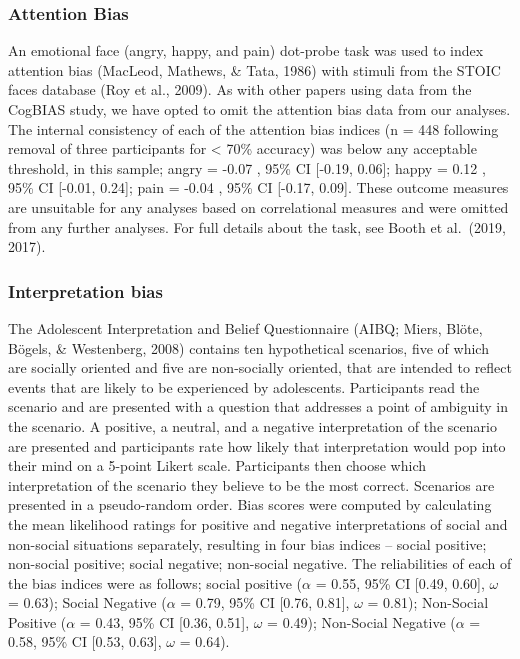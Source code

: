 \documentclass[man,floatsintext]{apa6}
\begin{document}
\hypertarget{attention-bias}{%
\subsubsection{Attention Bias}\label{attention-bias}}

An emotional face (angry, happy, and pain) dot-probe task was used to index attention bias (MacLeod, Mathews, \& Tata, 1986) with stimuli from the STOIC faces database (Roy et al., 2009). As with other papers using data from the CogBIAS study, we have opted to omit the attention bias data from our analyses. The internal consistency of each of the attention bias indices (n = 448 following removal of three participants for \textless{} 70\% accuracy) was below any acceptable threshold, in this sample; angry = -0.07 , 95\% CI {[}-0.19, 0.06{]}; happy = 0.12 , 95\% CI {[}-0.01, 0.24{]}; pain = -0.04 , 95\% CI {[}-0.17, 0.09{]}. These outcome measures are unsuitable for any analyses based on correlational measures and were omitted from any further analyses. For full details about the task, see Booth et al.~(2019, 2017).

\hypertarget{interpretation-bias}{%
\subsubsection{Interpretation bias}\label{interpretation-bias}}

The Adolescent Interpretation and Belief Questionnaire (AIBQ; Miers, Blöte, Bögels, \& Westenberg, 2008) contains ten hypothetical scenarios, five of which are socially oriented and five are non-socially oriented, that are intended to reflect events that are likely to be experienced by adolescents. Participants read the scenario and are presented with a question that addresses a point of ambiguity in the scenario. A positive, a neutral, and a negative interpretation of the scenario are presented and participants rate how likely that interpretation would pop into their mind on a 5-point Likert scale. Participants then choose which interpretation of the scenario they believe to be the most correct. Scenarios are presented in a pseudo-random order. Bias scores were computed by calculating the mean likelihood ratings for positive and negative interpretations of social and non-social situations separately, resulting in four bias indices -- social positive; non-social positive; social negative; non-social negative. The reliabilities of each of the bias indices were as follows; social positive (\(\alpha\) = 0.55, 95\% CI {[}0.49, 0.60{]}, \(\omega\) = 0.63); Social Negative (\(\alpha\) = 0.79, 95\% CI {[}0.76, 0.81{]}, \(\omega\) = 0.81); Non-Social Positive (\(\alpha\) = 0.43, 95\% CI {[}0.36, 0.51{]}, \(\omega\) = 0.49); Non-Social Negative (\(\alpha\) = 0.58, 95\% CI {[}0.53, 0.63{]}, \(\omega\) = 0.64).
\end{document}

